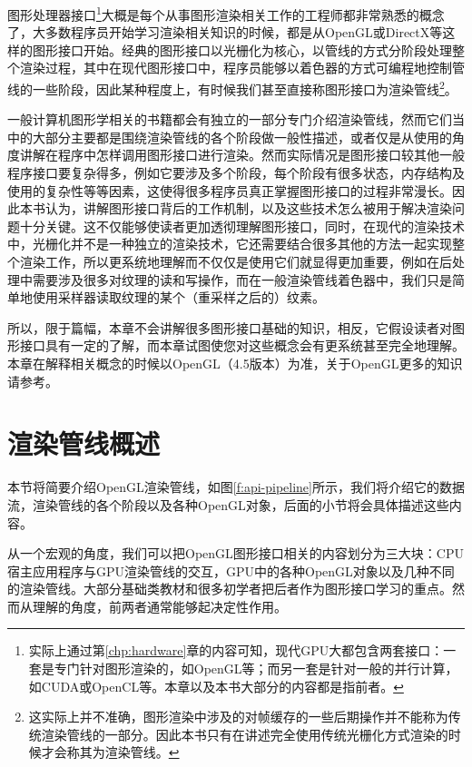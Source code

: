 图形处理器接口\footnote{实际上通过第\ref{chp:hardware}章的内容可知，现代GPU大都包含两套接口：一套是专门针对图形渲染的，如OpenGL等；而另一套是针对一般的并行计算，如CUDA或OpenCL等。本章以及本书大部分的内容都是指前者。}大概是每个从事图形渲染相关工作的工程师都非常熟悉的概念了，大多数程序员开始学习渲染相关知识的时候，都是从OpenGL或DirectX等这样的图形接口开始。经典的图形接口以光栅化为核心，以管线的方式分阶段处理整个渲染过程，其中在现代图形接口中，程序员能够以着色器的方式可编程地控制管线的一些阶段，因此某种程度上，有时候我们甚至直接称图形接口为渲染管线\footnote{这实际上并不准确，图形渲染中涉及的对帧缓存的一些后期操作并不能称为传统渲染管线的一部分。因此本书只有在讲述完全使用传统光栅化方式渲染的时候才会称其为渲染管线。}。

一般计算机图形学相关的书籍都会有独立的一部分专门介绍渲染管线，然而它们当中的大部分主要都是围绕渲染管线的各个阶段做一般性描述，或者仅是从使用的角度讲解在程序中怎样调用图形接口进行渲染。然而实际情况是图形接口较其他一般程序接口要复杂得多，例如它要涉及多个阶段，每个阶段有很多状态，内存结构及使用的复杂性等等因素，这使得很多程序员真正掌握图形接口的过程非常漫长。因此本书认为，讲解图形接口背后的工作机制，以及这些技术怎么被用于解决渲染问题十分关键。这不仅能够使读者更加透彻理解图形接口，同时，在现代的渲染技术中，光栅化并不是一种独立的渲染技术，它还需要结合很多其他的方法一起实现整个渲染工作，所以更系统地理解而不仅仅是使用它们就显得更加重要，例如在后处理中需要涉及很多对纹理的读和写操作，而在一般渲染管线着色器中，我们只是简单地使用采样器读取纹理的某个（重采样之后的）纹素。

所以，限于篇幅，本章不会讲解很多图形接口基础的知识，相反，它假设读者对图形接口具有一定的了解，而本章试图使您对这些概念会有更系统甚至完全地理解。本章在解释相关概念的时候以OpenGL（4.5版本）为准，关于OpenGL更多的知识请参考\cite{b:OpenGLProgrammingGuide:TheOfficialGuidetoLearningOpenGLVersion4.3, b:OpenGL4.5CoreProfile, b:TheOpenGLShadingLanguage}。





\section{渲染管线概述}
本节将简要介绍OpenGL渲染管线，如图\ref{f:api-pipeline}所示，我们将介绍它的数据流，渲染管线的各个阶段以及各种OpenGL对象，后面的小节将会具体描述这些内容。

从一个宏观的角度，我们可以把OpenGL图形接口相关的内容划分为三大块：CPU宿主应用程序与GPU渲染管线的交互，GPU中的各种OpenGL对象以及几种不同的渲染管线。大部分基础类教材和很多初学者把后者作为图形接口学习的重点。然而从理解的角度，前两者通常能够起决定性作用。

